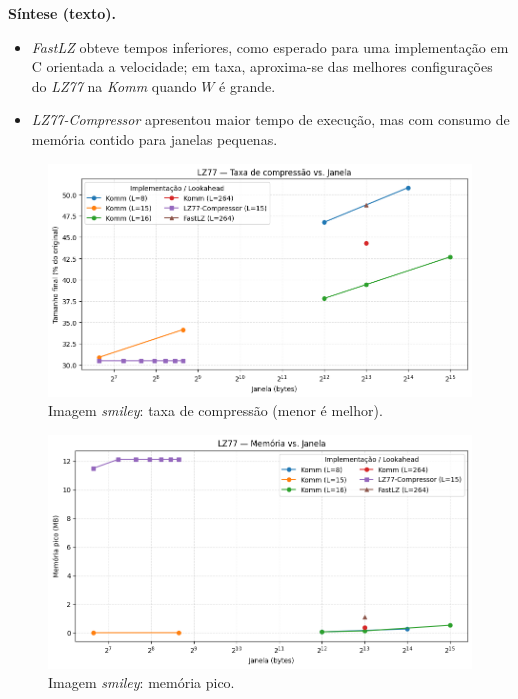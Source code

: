 \noindent\textbf{Síntese (texto).}
\begin{itemize}
  \item \textit{FastLZ} obteve tempos inferiores, como esperado para uma implementação em C orientada a velocidade; em taxa, aproxima-se das melhores configurações do \textit{LZ77} na \textit{Komm} quando \(W\) é grande.
  \item \textit{LZ77-Compressor} apresentou maior tempo de execução, mas com consumo de memória contido para janelas pequenas.
\end{itemize}

\begin{figure}[htp]
  \centering
  \caption{Imagem \textit{smiley}: taxa de compressão (menor é melhor).}
  \label{fig:external-smiley-compression}
  \includegraphics[width=15cm]{figuras/lz77_smiley_compression_window.png}
\end{figure}

\begin{figure}[htp]
  \centering
  \caption{Imagem \textit{smiley}: memória pico.}
  \label{fig:external-smiley-memory}
  \includegraphics[width=15cm]{figuras/lz77_smiley_memory_window.png}
\end{figure}

